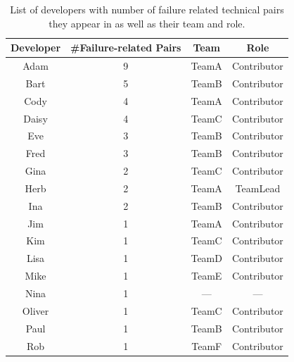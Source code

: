 \documentclass{sig-alternate}
\begin{document}
\begin{table}[t]
\centering
\begin{tabular}{cccc}
\toprule
Developer & \#Failure-related Pairs & Team & Role\\
\midrule
Adam & 9 & TeamA & Contributor\\
Bart & 5 & TeamB & Contributor\\
Cody & 4 & TeamA & Contributor\\
Daisy & 4 & TeamC & Contributor\\
Eve & 3 & TeamB & Contributor\\
Fred & 3 & TeamB & Contributor\\
Gina & 2 & TeamC & Contributor\\
Herb & 2 & TeamA & TeamLead\\
Ina & 2 & TeamB & Contributor\\
Jim & 1 & TeamA & Contributor\\
Kim & 1 & TeamC & Contributor\\
Lisa & 1 & TeamD & Contributor\\
Mike & 1 & TeamE & Contributor\\
Nina & 1 & --- & ---\\
Oliver & 1 & TeamC & Contributor\\
Paul & 1 & TeamB & Contributor\\
Rob & 1 & TeamF & Contributor\\
%
\bottomrule
\end{tabular}
\caption{List of developers with number of failure related technical pairs they appear in as well as their team and role.}
\label{tab:user}
\end{table}
\end{document}
